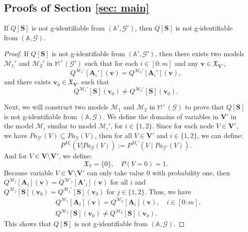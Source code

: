 \documentclass[accepted]{uai2022}
\newenvironment{customlem}[1]{\renewcommand\thelemma{#1}\lemma}{\endlemma}
\newcommand{\Pa}[2]{\textit{Pa}_{#2}(#1)}
\newcommand{\V}[0]{\mathbf{V}}
\newcommand{\G}[0]{\mathcal{G}}
\newcommand{\M}[0]{\mathcal{M}}
\newcommand{\dom}[1]{\mathfrak{X}_{#1}}
\begin{document}
\subsection{Proofs of Section \ref{sec: main}} \label{sec: proof sec main}
    \begin{customlem}{\ref{lem: simplify}}
        If $Q[\mathbf{S}]$ is not g-identifiable from $(\mathbb{A}', \G')$, then $Q[\mathbf{S}]$ is not g-identifiable from $(\mathbb{A}, \G)$.
    \end{customlem}
    \begin{proof}
        If $Q[\mathbf{S}]$ is not g-identifiable from $(\mathbb{A}', \G')$, then there exists two models $\M_1'$ and $\M_2'$ in $\mathbb{M}^+(\G')$ such that for each $i\in [0:m]$ and any $\mathbf{v} \in \dom{\V'}$,
        \begin{equation*}
            Q^{\M_1'}[\mathbf{A}_i'](\mathbf{v}) = Q^{\M_2'}[\mathbf{A}_i'](\mathbf{v}), 
        \end{equation*}
        and there exists $\mathbf{v}_0 \in \dom{\V'}$ such that 
        \begin{equation*}
            Q^{\M_1'}[\mathbf{S}](\mathbf{v}_0) \neq Q^{\M_2'}[\mathbf{S}](\mathbf{v}_0).
        \end{equation*}
        
        Next, we will construct two models $\M_1$ and $\M_2$ in $\mathbb{M}^+(\G)$ to prove that $Q[\mathbf{S}]$ is not g-identifiable from $(\mathbb{A}, \G)$. 
        We define the domains of variables in $\V'$ in the model $\M_i$ similar to model $\M_i'$, for $i \in \{1, 2\}$. 
        Since for each node $V\in\V'$, we have $\Pa{V}{\G'}\subseteq\Pa{V}{\G}$, then for all $V\in \V'$ and $i \in \{1, 2\}$, we can define:
        \begin{equation*}
            P^{M_i}(V|\Pa{V}{\G}) := P^{M_i'}(V \mid \Pa{V}{\G'}).
        \end{equation*}
        And for $V \in \V \setminus \V'$, we define:
        \begin{equation*}
            \dom{V} = \{0\}, \quad P(V=0)=1.
        \end{equation*}
        Because variable $V \in \V \setminus \V'$ can only take value $0$ with probability one, then $Q^{\M_j}[\mathbf{A}_i](\mathbf{v})=Q^{\M'_j}[\mathbf{A}'_i](\mathbf{v})$ for all $i$ and $Q^{\M_j}[\mathbf{S}](\mathbf{v}_0)=Q^{\M_j'}[\mathbf{S}](\mathbf{v}_0)$ for $j\in\{1,2\}$. 
        Thus, we have
        \begin{align*}
            &Q^{\M_1}[\mathbf{A}_i](\mathbf{v}) = Q^{\M_2}[\mathbf{A}_i](\mathbf{v}), \quad i\in[0:m],\\
            &Q^{\M_1}[\mathbf{S}](\mathbf{v}_0) \neq Q^{\M_2}[\mathbf{S}](\mathbf{v}_0).
        \end{align*}
        This shows that $Q[\mathbf{S}]$ is not g-identifiable from $(\mathbb{A}, \G)$.
    \end{proof}
 
\end{document}
